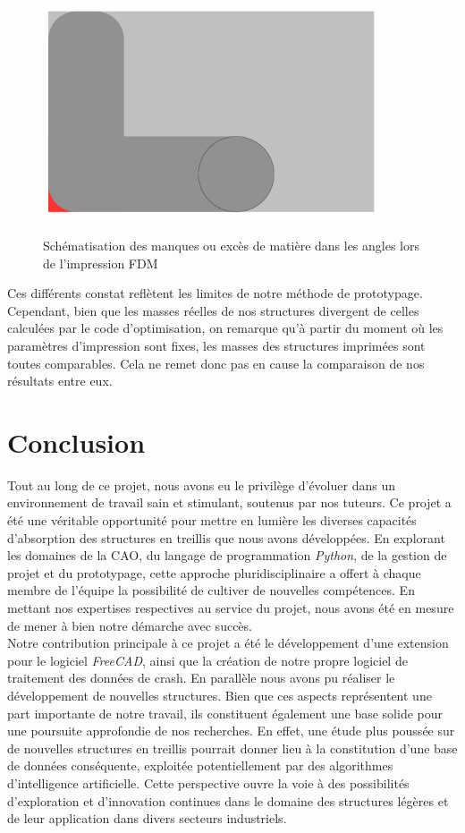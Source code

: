 \documentclass[a4paper]{article}
\begin{document}
	\newpage
	\begin{figure}[H]
		\centering
		\includegraphics[width=10cm]{Images/9/trou.pdf}\\
		\caption{Schématisation des manques ou excès de matière dans les angles lors de l’impression FDM}
	\end{figure}
	
	Ces différents constat reflètent les limites de notre méthode de prototypage. Cependant, bien que les masses réelles de nos structures divergent de celles calculées par le code d’optimisation, on remarque qu’à partir du moment où les paramètres d’impression sont fixes, les masses des structures imprimées sont toutes comparables. Cela ne remet donc pas en cause la comparaison de nos résultats entre eux.
	\newpage
	
	\section{Conclusion}
	\hspace{0.5cm}Tout au long de ce projet, nous avons eu le privilège d'évoluer dans un environnement de travail sain et stimulant, soutenus par nos tuteurs. Ce projet a été une véritable opportunité pour mettre en lumière les diverses capacités d'absorption des structures en treillis que nous avons développées. En explorant les domaines de la CAO, du langage de programmation \textit{Python}, de la gestion de projet et du prototypage, cette approche pluridisciplinaire a offert à chaque membre de l'équipe la possibilité de cultiver de nouvelles compétences. En mettant nos expertises respectives au service du projet, nous avons été en mesure de mener à bien notre démarche avec succès.\\
	
	Notre contribution principale à ce projet a été le développement d'une extension pour le logiciel \textit{FreeCAD}, ainsi que la création de notre propre logiciel de traitement des données de crash. En parallèle nous avons pu réaliser le développement de nouvelles structures. Bien que ces aspects représentent une part importante de notre travail, ils constituent également une base solide pour une poursuite approfondie de nos recherches. En effet, une étude plus poussée sur de nouvelles structures en treillis pourrait donner lieu à la constitution d'une base de données conséquente, exploitée potentiellement par des algorithmes d'intelligence artificielle. Cette perspective ouvre la voie à des possibilités d'exploration et d'innovation continues dans le domaine des structures légères et de leur application dans divers secteurs industriels.
	
\end{document}
